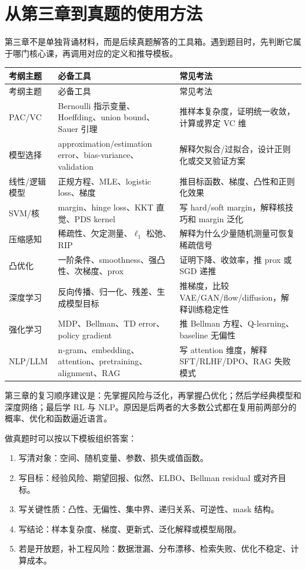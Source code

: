 \section{从第三章到真题的使用方法}

第三章不是单独背诵材料，而是后续真题解答的工具箱。遇到题目时，先判断它属于哪门核心课，再调用对应的定义和推导模板。

\begin{longtable}{L{0.24\textwidth}L{0.34\textwidth}L{0.34\textwidth}}
\toprule
考纲主题 & 必备工具 & 常见考法 \\
\midrule
\endfirsthead
\toprule
考纲主题 & 必备工具 & 常见考法 \\
\midrule
\endhead
PAC/VC & Bernoulli 指示变量、Hoeffding、union bound、Sauer 引理 & 推样本复杂度，证明统一收敛，计算或界定 VC 维 \\
模型选择 & approximation/estimation error、bias-variance、validation & 解释欠拟合/过拟合，设计正则化或交叉验证方案 \\
线性/逻辑模型 & 正规方程、MLE、logistic loss、梯度 & 推目标函数、梯度、凸性和正则化效果 \\
SVM/核 & margin、hinge loss、KKT 直觉、PDS kernel & 写 hard/soft margin，解释核技巧和 margin 泛化 \\
压缩感知 & 稀疏性、欠定测量、\(\ell_1\) 松弛、RIP & 解释为什么少量随机测量可恢复稀疏信号 \\
凸优化 & 一阶条件、smoothness、强凸性、次梯度、prox & 证明下降、收敛率，推 prox 或 SGD 递推 \\
深度学习 & 反向传播、归一化、残差、生成模型目标 & 推梯度，比较 VAE/GAN/flow/diffusion，解释训练稳定性 \\
强化学习 & MDP、Bellman、TD error、policy gradient & 推 Bellman 方程、Q-learning、baseline 无偏性 \\
NLP/LLM & n-gram、embedding、attention、pretraining、alignment、RAG & 写 attention 维度，解释 SFT/RLHF/DPO、RAG 失败模式 \\
\bottomrule
\end{longtable}

\begin{checkpoint}
第三章的复习顺序建议是：先掌握风险与泛化，再掌握凸优化；然后学经典模型和深度网络；最后学 RL 与 NLP。原因是后两者的大多数公式都在复用前两部分的概率、优化和函数逼近语言。
\end{checkpoint}

\examnote
做真题时可以按以下模板组织答案：

\begin{enumerate}
  \item 写清对象：空间、随机变量、参数、损失或值函数。
  \item 写目标：经验风险、期望回报、似然、ELBO、Bellman residual 或对齐目标。
  \item 写关键性质：凸性、无偏性、集中界、递归关系、可逆性、mask 结构。
  \item 写结论：样本复杂度、梯度、更新式、泛化解释或模型局限。
  \item 若是开放题，补工程风险：数据泄漏、分布漂移、检索失败、优化不稳定、计算成本。
\end{enumerate}
